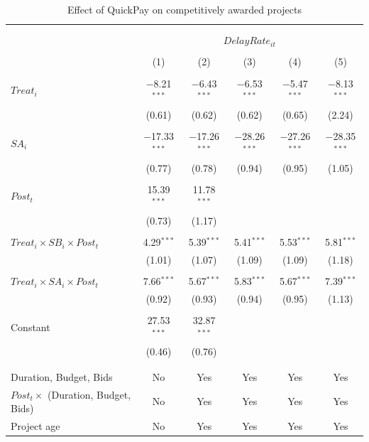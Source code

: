 \documentclass[
]{article}
\begin{document}
\begin{table}[H] \centering 
  \caption{Effect of QuickPay on competitively awarded projects} 
  \label{} 
\small 
\begin{tabular}{@{\extracolsep{-2pt}}lccccc} 
\\[-1.8ex]\hline 
\hline \\[-1.8ex] 
\\[-1.8ex] & \multicolumn{5}{c}{$DelayRate_{it}$  } \\ 
\\[-1.8ex] & (1) & (2) & (3) & (4) & (5)\\ 
\hline \\[-1.8ex] 
 $Treat_i$ & $-$8.21$^{***}$ & $-$6.43$^{***}$ & $-$6.53$^{***}$ & $-$5.47$^{***}$ & $-$8.13$^{***}$ \\ 
  & (0.61) & (0.62) & (0.62) & (0.65) & (2.24) \\ 
  & & & & & \\ 
 $SA_i$ & $-$17.33$^{***}$ & $-$17.26$^{***}$ & $-$28.26$^{***}$ & $-$27.26$^{***}$ & $-$28.35$^{***}$ \\ 
  & (0.77) & (0.78) & (0.94) & (0.95) & (1.05) \\ 
  & & & & & \\ 
 $Post_t$ & 15.39$^{***}$ & 11.78$^{***}$ &  &  &  \\ 
  & (0.73) & (1.17) &  &  &  \\ 
  & & & & & \\ 
 $Treat_i \times SB_i \times Post_t$ & 4.29$^{***}$ & 5.39$^{***}$ & 5.41$^{***}$ & 5.53$^{***}$ & 5.81$^{***}$ \\ 
  & (1.01) & (1.07) & (1.09) & (1.09) & (1.18) \\ 
  & & & & & \\ 
 $Treat_i \times SA_i \times Post_t$ & 7.66$^{***}$ & 5.67$^{***}$ & 5.83$^{***}$ & 5.67$^{***}$ & 7.39$^{***}$ \\ 
  & (0.92) & (0.93) & (0.94) & (0.95) & (1.13) \\ 
  & & & & & \\ 
 Constant & 27.53$^{***}$ & 32.87$^{***}$ &  &  &  \\ 
  & (0.46) & (0.76) &  &  &  \\ 
  & & & & & \\ 
\hline \\[-1.8ex] 
Duration, Budget, Bids & No & Yes & Yes & Yes & Yes \\ 
$Post_t \times $  (Duration, Budget, Bids) & No & Yes & Yes & Yes & Yes \\ 
Project age & No & Yes & Yes & Yes & Yes \\ 

\end{tabular}
\end{table}
\end{document}

